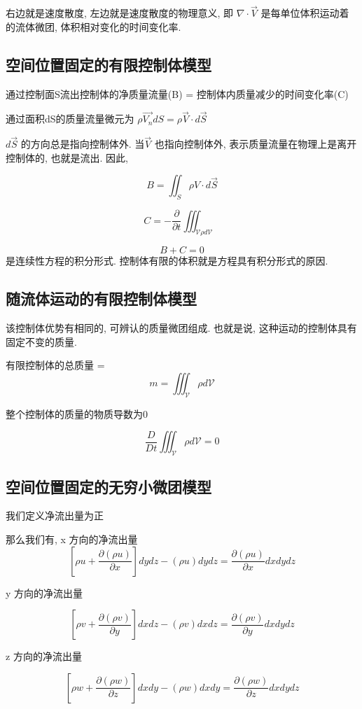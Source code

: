 \documentclass[UTF8]{ctexart}
\begin{document}
右边就是速度散度, 左边就是速度散度的物理意义, 即 $\nabla \cdot \vec{V}$ 是每单位体积运动着的流体微团, 体积相对变化的时间变化率.

\subsection{空间位置固定的有限控制体模型}
通过控制面S流出控制体的净质量流量(B) = 控制体内质量减少的时间变化率(C)

通过面积dS的质量流量微元为 $\rho \vec{V_n} dS = \rho \vec{V} \cdot d\vec{S}$

$d \vec{S}$ 的方向总是指向控制体外. 当$\vec{V}$ 也指向控制体外, 表示质量流量在物理上是离开控制体的, 也就是流出. 因此,

$$
	B = \iint_{S} \rho V \cdot d\vec{S}
$$

$$
	C = - \frac{\partial}{\partial t}\iiint_{\mathcal{V} \rho d \mathcal{V}}
$$

$$
	B + C = 0
$$
是连续性方程的积分形式. 控制体有限的体积就是方程具有积分形式的原因.


\subsection{随流体运动的有限控制体模型}
该控制体优势有相同的, 可辨认的质量微团组成. 也就是说, 这种运动的控制体具有固定不变的质量.

有限控制体的总质量 =
$$
	m = \iiint_{\mathcal{V}} \rho d \mathcal{V}
$$

整个控制体的质量的物质导数为0

$$
	\frac{D}{Dt} \iiint_{\mathcal{V}} \rho d \mathcal{V} = 0
$$

\subsection{空间位置固定的无穷小微团模型}

我们定义净流出量为正

那么我们有, x 方向的净流出量
$$
	[ \rho u + \frac{\partial (\rho u)}{\partial x} ] dy dz - (\rho u) dydz = \frac{\partial (\rho u)}{\partial x} dxdydz
$$

y 方向的净流出量

$$
	[ \rho v + \frac{\partial (\rho v)}{\partial y} ] dx dz - (\rho v) dxdz = \frac{\partial (\rho v)}{\partial y} dxdydz
$$

z 方向的净流出量

$$
	[ \rho w + \frac{\partial (\rho w)}{\partial z} ] dx dy - (\rho w) dxdy = \frac{\partial (\rho w)}{\partial z} dxdydz
$$
\end{document}

